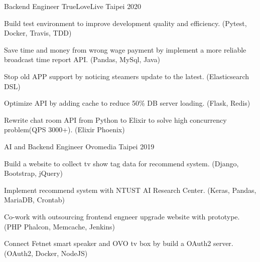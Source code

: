 

\begin{cventries}

  \cventry
    {Backend Engineer} %
    {TrueLoveLive} %
    {Taipei} %
    {2020} %
    {
      \begin{cvitems} %
        \item {Build test environment to improve development quality and efficiency. (Pytest, Docker, Travis, TDD)}
        \item {Save time and money from wrong wage payment by implement a more reliable broadcast time report API. (Pandas, MySql, Java)}
        \item {Stop old APP support by noticing steamers update to the latest. (Elasticsearch DSL)}
        \item {Optimize API by adding cache to reduce 50\% DB server loading. (Flask, Redis)}
        \item {Rewrite chat room API from Python to Elixir to solve high concurrency problem(QPS 3000+). (Elixir Phoenix)}
      \end{cvitems}
    }

  \cventry
    {AI and Backend Engineer} %
    {Ovomedia} %
    {Taipei} %
    {2019} %
    {
      \begin{cvitems} %
        \item {Build a website to collect tv show tag data for recommend system. (Django, Bootstrap, jQuery)}
        \item {Implement recommend system with NTUST AI Research Center. (Keras, Pandas, MariaDB, Crontab)}
        \item {Co-work with outsourcing frontend engneer upgrade website with prototype. (PHP Phalcon, Memcache, Jenkins)}
        \item {Connect Fetnet smart speaker and OVO tv box by build a OAuth2 server. (OAuth2, Docker, NodeJS)}
      \end{cvitems}
    }

\end{cventries}
